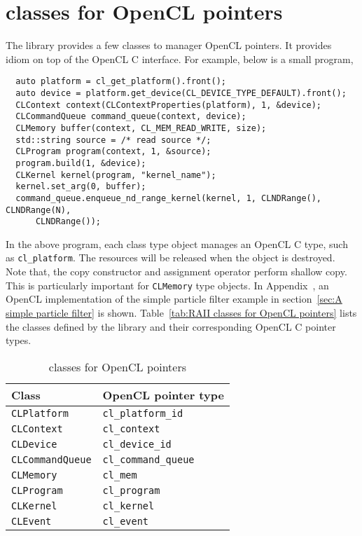 \section{\protect\raii classes for OpenCL pointers}
\label{sec:RAII classes for OpenCL pointers}

The library provides a few classes to manager OpenCL pointers. It provides
\raii idiom on top of the OpenCL C interface. For example, below is a small
program,
\begin{Verbatim}
  auto platform = cl_get_platform().front();
  auto device = platform.get_device(CL_DEVICE_TYPE_DEFAULT).front();
  CLContext context(CLContextProperties(platform), 1, &device);
  CLCommandQueue command_queue(context, device);
  CLMemory buffer(context, CL_MEM_READ_WRITE, size);
  std::string source = /* read source */;
  CLProgram program(context, 1, &source);
  program.build(1, &device);
  CLKernel kernel(program, "kernel_name");
  kernel.set_arg(0, buffer);
  command_queue.enqueue_nd_range_kernel(kernel, 1, CLNDRange(), CLNDRange(N),
      CLNDRange());
\end{Verbatim}
In the above program, each class type object manages an OpenCL C type, such as
\verb|cl_platform|. The resources will be released when the object is
destroyed. Note that, the copy constructor and assignment operator perform
shallow copy. This is particularly important for \verb|CLMemory| type objects.
In Appendix~, an OpenCL
implementation of the simple particle filter example in section~\ref{sec:A
  simple particle filter} is shown. Table~\ref{tab:RAII classes for OpenCL
  pointers} lists the classes defined by the library and their corresponding
OpenCL C pointer types.

\begin{table}
  \begin{tabularx}{\textwidth}{LL}
    \toprule
    Class & OpenCL pointer type \\
    \midrule
    \verb|CLPlatform|     & \verb|cl_platform_id|   \\
    \verb|CLContext|      & \verb|cl_context|       \\
    \verb|CLDevice|       & \verb|cl_device_id|     \\
    \verb|CLCommandQueue| & \verb|cl_command_queue| \\
    \verb|CLMemory|       & \verb|cl_mem|           \\
    \verb|CLProgram|      & \verb|cl_program|       \\
    \verb|CLKernel|       & \verb|cl_kernel|        \\
    \verb|CLEvent|        & \verb|cl_event|         \\
    \bottomrule
  \end{tabularx}
  \caption{\protect\raii classes for OpenCL pointers}
  \label{tab:RAII classes for OpenCL pointers}
\end{table}

